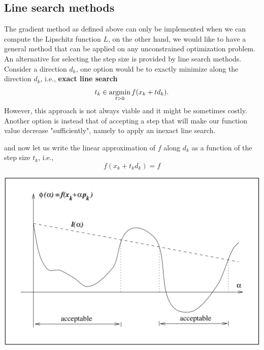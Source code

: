 \documentclass[10pt,a4paper]{article}
\begin{document}
\subsection{Line search methods}
The gradient method as defined above can only be implemented when we can compute the Lipschitz function $L$, on the other hand, we would like to have a general method that can be applied on any unconstrained optimization problem. An alternative for selecting the step size is provided by line search methods. Consider a direction $d_k$, one option would be to exactly minimize along the direction $d_k$, i.e., \textbf{exact line search}
\begin{equation*}
	t_k \in \operatorname*{argmin}_{t>0} f(x_k+t d_k).
\end{equation*}
However, this approach is not always viable and it might be sometimes costly. Another option is instead that of accepting a step that will make our function value decrease "sufficiently", namely to apply an inexact line search.

and now let us write the linear approximation of $f$ along $d_k$ as a function of the step size $t_k$, i.e.,
\begin{equation*}
	f(x_k +t_k d_k) = f
\end{equation*}
\begin{center}
	\includegraphics[width=0.5\linewidth]{lines}
\end{center}
\end{document}
